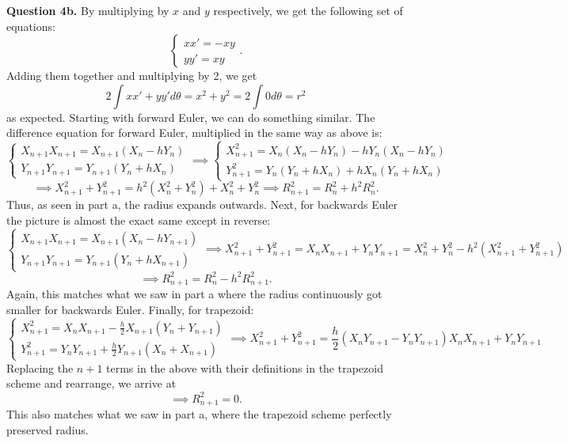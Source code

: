 \documentclass[letterpaper, reqno,11pt]{article}
\begin{document}
{\medskip\noindent\bf Question 4b.} By multiplying by $x$ and $y$ respectively, we get the following set of equations:
\[
\begin{cases}
    x x'=-xy\\
    yy'=xy
\end{cases}
.\]
Adding them together and multiplying by 2, we get
\[
2\int x x'+y y' d\theta=x^2+y^2=2\int 0d\theta=r^2
\]
as expected. Starting with forward Euler, we can do something similar. The difference equation for forward Euler, multiplied in the same way as above is:
\[
\begin{cases}
    X_{n+1}X_{n+1}=X_{n+1}\left( X_n-hY_{n} \right) \\
    Y_{n+1}Y_{n+1}=Y_{n+1}\left( Y_n+hX_n \right) 
\end{cases}\implies \begin{cases}
    X_{n+1}^2=X_n(X_n-hY_n)-hY_n(X_n-hY_n)\\
    Y_{n+1}^2=Y_n\left( Y_n+hX_n \right) +hX_n\left( Y_n+hX_n \right) 
\end{cases}
\]
\[
\implies X_{n+1}^2+Y_{n+1}^2=h^2\left( X_{n}^2+Y_{n}^2 \right) +X_n^2+Y_n^2\implies R_{n+1}^2=R_n^2+h^2R_n^2
.\]
Thus, as seen in part a, the radius expands outwards. Next, for backwards Euler the picture is almost the exact same except in reverse:
\[
\begin{cases}
    X_{n+1}X_{n+1}=X_{n+1}\left( X_n-hY_{n+1} \right) \\
    Y_{n+1}Y_{n+1}=Y_{n+1}\left( Y_n+hX_{n+1} \right) 
\end{cases}\implies X_{n+1}^2+Y_{n+1}^2=X_nX_{n+1}+Y_nY_{n+1}=X_{n}^2+Y_n^2-h^2(X_{n+1}^2+Y_{n+1}^2)
\]
\[
\implies R_{n+1}^2=R_n^2-h^2R_{n+1}^2
.\]
Again, this matches what we saw in part a where the radius continuously got smaller for backwards Euler. Finally, for trapezoid:
\[
\begin{cases}
    X_{n+1}^2=X_nX_{n+1}-\frac{h}{2}X_{n+1}\left( Y_n+Y_{n+1} \right) \\
    Y_{n+1}^2=Y_nY_{n+1}+\frac{h}{2}Y_{n+1}\left( X_{n}+X_{n+1} \right) 
\end{cases}\implies X_{n+1}^2+Y_{n+1}^2=\frac{h}{2}\left( X_nY_{n+1}-Y_nY_{n+1} \right) X_nX_{n+1}+Y_nY_{n+1}
\]
Replacing the $n+1$ terms in the above with their definitions in the trapezoid scheme and rearrange, we arrive at
\[
\implies R_{n+1}^2=0
.\]
This also matches what we saw in part a, where the trapezoid scheme perfectly preserved radius.
\end{document}
